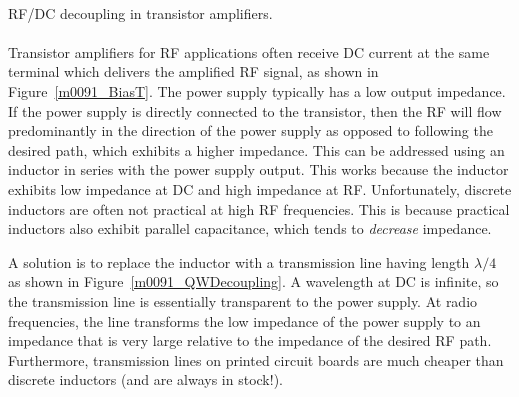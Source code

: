 ~\\ \begin{example} 
\begin{mdframed}[backgroundcolor=brown!20,linecolor=brown!20]\raggedright
RF/DC decoupling in transistor amplifiers.
\\~\\
Transistor amplifiers for RF applications often receive DC current at the same terminal which delivers the amplified RF signal, as shown in Figure~\ref{m0091_BiasT}.
The power supply typically has a low output impedance.
If the power supply is directly connected to the transistor, then the RF will flow predominantly in the direction of the power supply as opposed to following the desired path, which exhibits a higher impedance.
This can be addressed using an inductor in series with the power supply output.
This works because the inductor exhibits low impedance at DC and high impedance at RF.
Unfortunately, discrete inductors are often not practical at high RF frequencies.
This is because practical inductors also exhibit parallel capacitance, which tends to \emph{decrease} impedance.  

A solution is to replace the inductor with a transmission line having length $\lambda/4$ as shown in Figure~\ref{m0091_QWDecoupling}.
A wavelength at DC is infinite, so the transmission line is essentially transparent to the power supply.
At radio frequencies, the line transforms the low impedance of the power supply to an impedance that is very large relative to the impedance of the desired RF path.
Furthermore, transmission lines on printed circuit boards are much cheaper than discrete inductors (and are always in stock!).


\end{mdframed}
\end{example}
